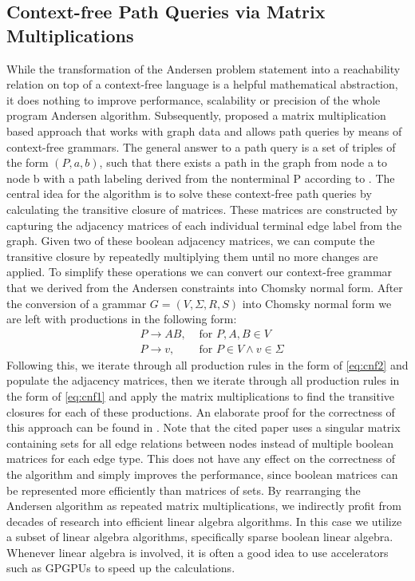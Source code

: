 \subsection{Context-free Path Queries via Matrix Multiplications}
While the transformation of the Andersen problem statement into a reachability relation on top of a context-free language is a helpful mathematical abstraction, it does nothing to improve performance, scalability or precision of the whole program Andersen algorithm.
Subsequently, \cite{azimov2018context} proposed a matrix multiplication based approach that works with graph data and allows path queries by means of context-free grammars.
The general answer to a path query is a set of triples of the form $(P,a,b)$, such that there exists a path in the graph from node a to node b with a path labeling derived from the nonterminal P according to \cite{azimov2018context}.
The central idea for the algorithm is to solve these context-free path queries by calculating the transitive closure of matrices. These matrices are constructed by capturing the adjacency matrices of each individual terminal edge label from the graph. Given two of these boolean adjacency matrices, we can compute the transitive closure by repeatedly multiplying them until no more changes are applied.
To simplify these operations we can convert our context-free grammar that we derived from the Andersen constraints into Chomsky normal form.
After the conversion of a grammar $G=(V,\Sigma,R,S)$ into Chomsky normal form we are left with productions in the following form:
\begin{align}
     & P\rightarrow AB, & \textrm{ for } P,A,B \in V \label{eq:cnf1}               \\
     & P\rightarrow v,  & \textrm{ for } P \in V \land v\in \Sigma \label{eq:cnf2}
\end{align}
Following this, we iterate through all production rules in the form of \autoref{eq:cnf2} and populate the adjacency matrices, then we iterate through all production rules in the form of \autoref{eq:cnf1} and apply the matrix multiplications to find the transitive closures for each of these productions.
An elaborate proof for the correctness of this approach can be found in \cite{azimov2018context}.
Note that the cited paper uses a singular matrix containing sets for all edge relations between nodes instead of multiple boolean matrices for each edge type.
This does not have any effect on the correctness of the algorithm and simply improves the performance, since boolean matrices can be represented more efficiently than matrices of sets.
By rearranging the Andersen algorithm as repeated matrix multiplications, we indirectly profit from decades of research into efficient linear algebra algorithms.
In this case we utilize a subset of linear algebra algorithms, specifically sparse boolean linear algebra.
Whenever linear algebra is involved, it is often a good idea to use accelerators such as GPGPUs to speed up the calculations.

